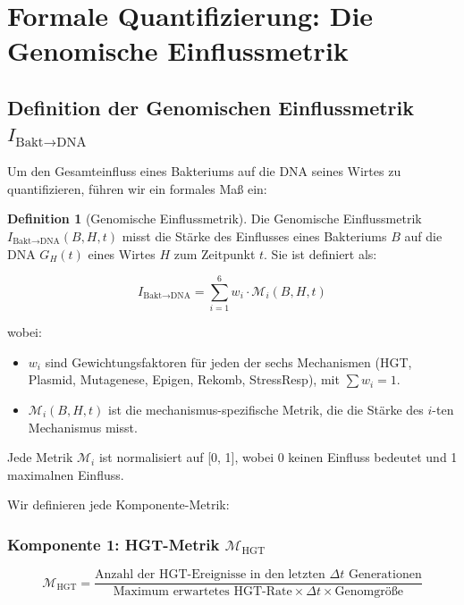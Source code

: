 \documentclass[a4paper,12pt]{article}
\theoremstyle{definition}
\newtheorem{definition}{Definition}
\begin{document}
\section{Formale Quantifizierung: Die Genomische Einflussmetrik}


\subsection{Definition der Genomischen Einflussmetrik $I_{\text{Bakt} \to \text{DNA}}$}

Um den Gesamteinfluss eines Bakteriums auf die DNA seines Wirtes zu quantifizieren, führen wir ein formales Maß ein:

\begin{definition}[Genomische Einflussmetrik]
Die Genomische Einflussmetrik $I_{\text{Bakt} \to \text{DNA}}(B, H, t)$ misst die Stärke des Einflusses eines Bakteriums $B$ auf die DNA $G_H(t)$ eines Wirtes $H$ zum Zeitpunkt $t$. Sie ist definiert als:

\[
I_{\text{Bakt} \to \text{DNA}} = \sum_{i=1}^{6} w_i \cdot \mathcal{M}_i(B, H, t)
\]

wobei:
\begin{itemize}
    \item[-] $w_i$ sind Gewichtungsfaktoren für jeden der sechs Mechanismen (HGT, Plasmid, Mutagenese, Epigen, Rekomb, StressResp), mit $\sum w_i = 1$.
    \item[-] $\mathcal{M}_i(B, H, t)$ ist die mechanismus-spezifische Metrik, die die Stärke des $i$-ten Mechanismus misst.
\end{itemize}

Jede Metrik $\mathcal{M}_i$ ist normalisiert auf [0, 1], wobei 0 keinen Einfluss bedeutet und 1 maximalnen Einfluss.
\end{definition}

Wir definieren jede Komponente-Metrik:

\subsubsection{Komponente 1: HGT-Metrik $\mathcal{M}_{\text{HGT}}$}

\[
\mathcal{M}_{\text{HGT}} = \frac{\text{Anzahl der HGT-Ereignisse in den letzten } \Delta t \text{ Generationen}}{\text{Maximum erwartetes HGT-Rate} \times \Delta t \times \text{Genomgröße}}
\]
\end{document}
